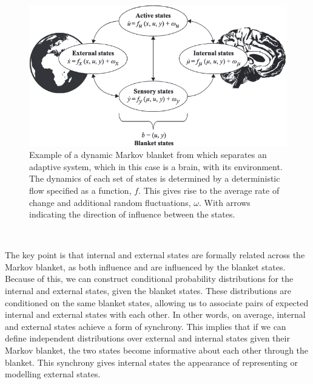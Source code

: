 \documentclass{article}
\begin{document}
\begin{figure}[htbp]
    \centering
    \includegraphics[scale=0.55]{images/markov_blanket.png}
    \caption{Example of a dynamic Markov blanket from \citet{parr2022ActiveInference} which separates an adaptive system, which in this case is a brain, with its environment. The dynamics of each set of states is determined by a deterministic flow specified as a function, $f$. This gives rise to the average rate of change and additional random fluctuations, $\omega$. With arrows indicating the direction of influence between the states.}
    \label{fig:markov_blanket}
\end{figure}

\

The key point is that internal and external states are formally related across the Markov blanket, as both influence and are influenced by the blanket states. Because of this, we can construct conditional probability distributions for the internal and external states, given the blanket states. These distributions are conditioned on the same blanket states, allowing us to associate pairs of expected internal and external states with each other. In other words, on average, internal and external states achieve a form of synchrony. This implies that if we can define independent distributions over external and internal states given their Markov blanket, the two states become informative about each other through the blanket. This synchrony gives internal states the appearance of representing or modelling external states.

\
\end{document}
